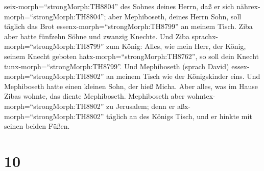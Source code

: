 seix-morph=``strongMorph:TH8804'' des Sohnes deines Herrn, daß er sich
nährex-morph=``strongMorph:TH8804''; aber Mephiboseth, deines Herrn
Sohn, soll täglich das Brot essenx-morph=``strongMorph:TH8799'' an
meinem Tisch. Ziba aber hatte fünfzehn Söhne und zwanzig Knechte.
 Und Ziba sprachx-morph=``strongMorph:TH8799'' zum König:
Alles, wie mein Herr, der König, seinem Knecht geboten
hatx-morph=``strongMorph:TH8762'', so soll dein Knecht
tunx-morph=``strongMorph:TH8799''. Und Mephiboseth (sprach David)
essex-morph=``strongMorph:TH8802'' an meinem Tisch wie der Königskinder
eins.  Und Mephiboseth hatte einen kleinen Sohn, der hieß
Micha. Aber alles, was im Hause Zibas wohnte, das diente Mephiboseth.
 Mephiboseth aber wohntex-morph=``strongMorph:TH8802'' zu
Jerusalem; denn er aßx-morph=``strongMorph:TH8802'' täglich an des
Königs Tisch, und er hinkte mit seinen beiden Füßen.

\hypertarget{section-9}{%
\section{10}\label{section-9}}

